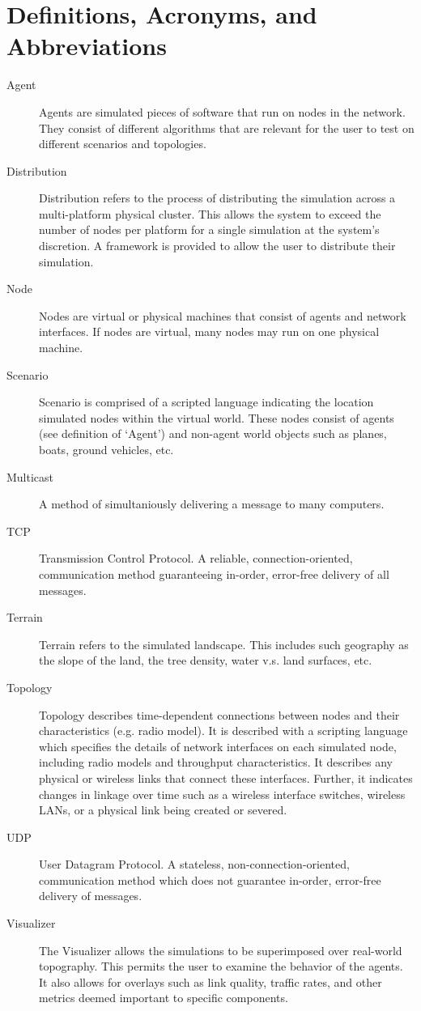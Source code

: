 \documentclass[titlepage]{article}
\begin{document}
\section{Definitions, Acronyms, and Abbreviations}
\label{sec:glossary}
\begin{description}
\item[Agent]
	Agents are simulated pieces of software that run on nodes in the network. They consist of different algorithms that are relevant for the user to test on different scenarios and topologies.   
\item[Distribution]
	Distribution refers to the process of distributing the simulation across a multi-platform physical cluster.  This allows the system to exceed the number of nodes per platform for a single simulation at the system's discretion.  A framework is provided to allow the user to distribute their simulation. 	
\item[Node]
	Nodes are virtual or physical machines that consist of agents and network interfaces.  If nodes are virtual, many nodes may run on one physical machine.  
\item[Scenario]
	Scenario is comprised of a scripted language indicating the location simulated nodes within the virtual world. These nodes consist of agents (see definition of `Agent') and non-agent world objects such as planes, boats, ground vehicles, etc. 
\item[Multicast]
    A method of simultaniously delivering a message to many computers.
\item[TCP]
    Transmission Control Protocol.  A reliable, connection-oriented, communication method guaranteeing in-order, error-free delivery of all messages.
\item[Terrain]
	Terrain refers to the simulated landscape.  This includes such geography as the slope of the land, the tree density, water v.s. land surfaces, etc.
\item[Topology]
	Topology describes time-dependent connections between nodes and their characteristics (e.g. radio model). It is described with a scripting language which specifies the details of network interfaces on each simulated node, including radio models and throughput characteristics.  It describes any physical or wireless links that connect these interfaces.  Further, it indicates changes in linkage over time such as a wireless interface switches, wireless LANs, or a physical link being created or severed. 
\item[UDP]
    User Datagram Protocol.  A stateless, non-connection-oriented, communication method which does not guarantee in-order, error-free delivery of messages.
\item[Visualizer]
	The Visualizer allows the simulations to be superimposed over real-world topography.  This permits the user to examine the behavior of the agents.  It also allows for overlays such as link quality, traffic rates, and other metrics deemed important to specific components.
\end{description}
\end{document}
